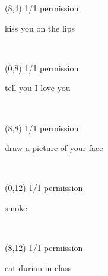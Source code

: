 \documentclass[a4paper]{article}
\newcommand{\mycard}[5]{%
	\vspace{0.1cm}
	\small #1 #2
	\par
	\parbox[t][6.7cm][c]{9.5cm}{%
	\hspace{0.1cm} \Large#3\\
	\normalsize#4 #5
	}
}
\begin{document}
\begin{textblock}{8}(8,4)
\mycard{1/1}{permission}{\parbox{9.0cm}{
kiss you on the lips
}}{}{} 
\end{textblock}

\begin{textblock}{8}(0,8)
\mycard{1/1}{permission}{\parbox{9.0cm}{
tell you I love you
}}{}{} 
\end{textblock}

\begin{textblock}{8}(8,8)
\mycard{1/1}{permission}{\parbox{9.0cm}{
draw a picture of your face
}}{}{} 
\end{textblock}

\begin{textblock}{8}(0,12)
\mycard{1/1}{permission}{\parbox{9.0cm}{
smoke
}}{}{} 
\end{textblock}

\begin{textblock}{8}(8,12)
\mycard{1/1}{permission}{\parbox{9.0cm}{
eat durian in class
}}{}{} 
\end{textblock}
\end{document}
